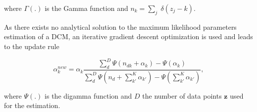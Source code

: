 where $\Gamma(.)$ is the Gamma function and $n_k=\sum_j\;\delta(z_j-k)$.

As there exists no analytical solution to the maximum likelihood parameters
estimation of a DCM, an iterative gradient descent optimization is used and
leads to the update rule

\begin{equation}
\label{eqn:alpha_update}
\alpha_k^{new} = \alpha_k\frac{\sum_d^D\Psi(n_{dk}+\alpha_k)-\Psi(\alpha_k)}
  {\sum_d^D\Psi(n_d+\sum_{k'}^K\alpha_{k'})-\Psi(\sum_{k'}^K\alpha_{k'})},
\end{equation}

where $\Psi(.)$ is the digamma function and $D$ the number of data points
$\mathbf{z}$ used for the estimation.
